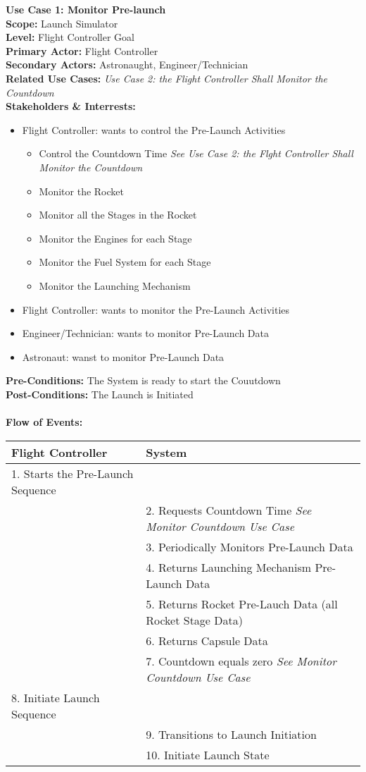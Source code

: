 \documentclass[letterpaper]{article}
\begin{document}
\noindent
\textbf{Use Case 1:  Monitor Pre-launch}\\
\textbf{Scope:  }Launch Simulator\\
\textbf{Level:  }Flight Controller Goal\\
\textbf{Primary Actor:  }Flight Controller\\
\textbf{Secondary Actors:  }Astronaught, Engineer/Technician\\
\textbf{Related Use Cases:  }\textit{Use Case 2:  the Flight
Controller Shall Monitor the Countdown}\\
\textbf{Stakeholders \& Interrests:  }
\begin{itemize}
\item Flight Controller: wants to control the Pre-Launch Activities
\begin{itemize}
\item Control the Countdown Time \textit{See Use Case 2:  the Flght
Controller Shall Monitor the Countdown}
\item Monitor the Rocket
\item Monitor all the Stages in the Rocket
\item Monitor the Engines for each Stage
\item Monitor the Fuel System for each Stage
\item Monitor the Launching Mechanism
\end{itemize}
\item Flight Controller: wants to monitor the Pre-Launch Activities
\item Engineer/Technician:  wants to monitor Pre-Launch Data
\item Astronaut:  wanst to monitor Pre-Launch Data
\end{itemize}
\textbf{Pre-Conditions:  }The System is ready to start the
Couutdown\\
\textbf{Post-Conditions:  }The Launch is Initiated\\\\
\textbf{Flow of Events:}\\
\begin{tabular}{|p{5.75cm}|p{5.75cm}|}\hline
\textbf{Flight Controller}&\textbf{System}\\\hline
1. Starts the Pre-Launch Sequence & \\\hline
& 2.  Requests Countdown Time \textit{See Monitor Countdown Use
Case}\\\hline
& 3. Periodically Monitors Pre-Launch Data\\\hline
& 4. Returns Launching Mechanism Pre-Launch Data\\\hline
& 5. Returns Rocket Pre-Lauch Data (all Rocket Stage Data)\\\hline
& 6. Returns Capsule Data\\\hline
& 7. Countdown equals zero \textit{See Monitor Countdown Use
Case}\\\hline
8. Initiate Launch Sequence & \\\hline
& 9.  Transitions to Launch Initiation\\\hline
& 10.  Initiate Launch State\\\hline
\end{tabular}\\\\
\end{document}
